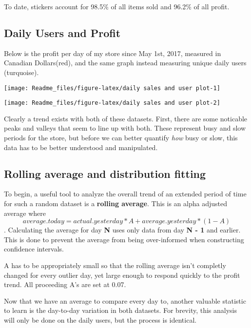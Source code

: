 \documentclass[]{article}
\begin{document}
To date, stickers account for 98.5\% of all items sold and 96.2\% of all
profit.

\subsection{Daily Users and Profit}\label{daily-users-and-profit}

Below is the profit per day of my store since May 1st, 2017, measured in
Canadian Dollars(red), and the same graph instead measuring unique daily
users (turquoise).

\begin{center}\texttt{[image: Readme\_files/figure-latex/daily sales and user plot-1]} \end{center}

\begin{center}\texttt{[image: Readme\_files/figure-latex/daily sales and user plot-2]} \end{center}

Clearly a trend exists with both of these datasets. First, there are
some noticable peaks and valleys that seem to line up with both. These
represent busy and slow periods for the store, but before we can better
quantify \emph{how} busy or slow, this data has to be better understood
and manipulated.

\subsection{Rolling average and distribution
fitting}\label{rolling-average-and-distribution-fitting}

To begin, a useful tool to analyze the overall trend of an extended
period of time for such a random dataset is a \textbf{rolling average}.
This is an alpha adjusted average where
\[average.today = actual.yesterday*A + average.yesterday*(1 - A)\].
Calculating the average for day \textbf{N} uses only data from day
\textbf{N - 1} and earlier. This is done to prevent the average from
being over-informed when constructing confidence intervals.

A has to be appropriately small so that the rolling average isn't
completly changed for every outlier day, yet large enough to respond
quickly to the profit trend. All proceeding A's are set at 0.07.

Now that we have an average to compare every day to, another valuable
statistic to learn is the day-to-day variation in both datasets. For
brevity, this analysis will only be done on the daily users, but the
process is identical.
\end{document}
